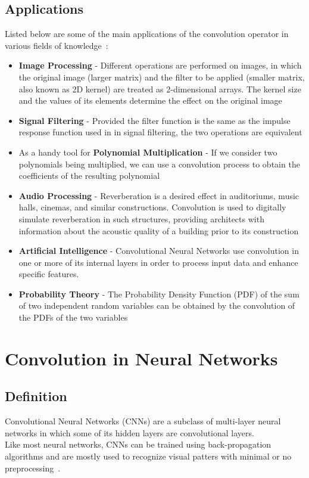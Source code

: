\subsection{Applications}
\label{sec:convolution:mathematics:applications}
Listed below are some of the main applications of the convolution operator in various fields of knowledge~\citep{Srivastava2013}:
\begin{itemize}
	\item \textbf{Image Processing} - Different operations are performed on images, in which the original image (larger matrix) and the filter to be applied (smaller matrix, also known as 2D kernel) are treated as 2-dimensional arrays. The kernel size and the values of its elements determine the effect on the original image
    \item \textbf{Signal Filtering} - Provided the filter function is the same as the impulse response function used in in signal filtering, the two operations are equivalent
    \item As a handy tool for \textbf{Polynomial Multiplication} - If we consider two polynomials being multiplied, we can use a convolution process to obtain the coefficients of the resulting polynomial
    \item \textbf{Audio Processing} - Reverberation is a desired effect in auditoriums, music halls, cinemas, and similar constructions. Convolution is used to digitally simulate reverberation in such structures, providing architects with information about the acoustic quality of a building prior to its construction
    \item \textbf{Artificial Intelligence} - Convolutional Neural Networks use convolution in one or more of its internal layers in order to process input data and enhance specific features.
    \item \textbf{Probability Theory} - The Probability Density Function (PDF) of the sum of two independent random variables can be obtained by the convolution of the PDFs of the two variables
\end{itemize}
\section{Convolution in Neural Networks}
\label{sec:convolution:convolutionalneuralnetworks}
\subsection{Definition}
\label{sec:convolution:convolutionalneuralnetworks:definition}
Convolutional Neural Networks (CNNs) are a subclass of multi-layer neural networks in which some of its hidden layers are convolutional layers.\\
Like most neural networks, CNNs can be trained using back-propagation algorithms and are mostly used to recognize visual patters with minimal or no preprocessing~\citep{Lawrence1997A}.\\
